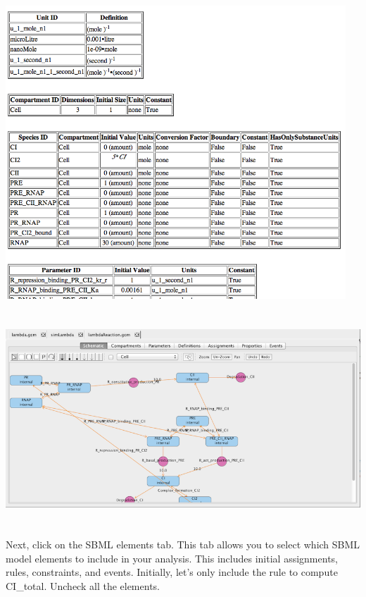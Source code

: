 \documentclass[titlepage,11pt]{article}
\begin{document}
\begin{center}
\includegraphics[height=110mm]{screenshots/viewBrowser}
\end{center}

\begin{center}
\includegraphics[height=80mm]{screenshots/reactionModel}
\end{center}

Next, click on the SBML elements tab.  This tab allows you to select which SBML model elements to include in your analysis.  This includes initial assignments, rules, constraints, and events.  Initially, let's only include the rule to compute CI\_total.  Uncheck all the elements.
\end{document}

